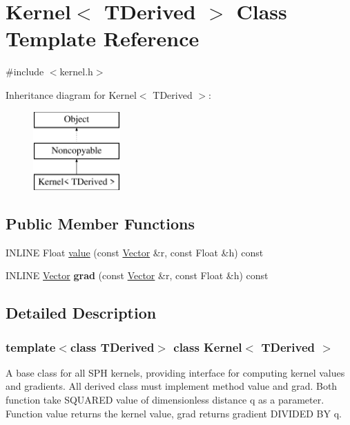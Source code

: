 \hypertarget{classKernel}{}\section{Kernel$<$ T\+Derived $>$ Class Template Reference}
\label{classKernel}


{\ttfamily \#include $<$kernel.\+h$>$}

Inheritance diagram for Kernel$<$ T\+Derived $>$\+:\begin{figure}[H]
\begin{center}
\leavevmode
\includegraphics[height=3.000000cm]{classKernel}
\end{center}
\end{figure}
\subsection*{Public Member Functions}
\begin{DoxyCompactItemize}
\item 
I\+N\+L\+I\+NE Float \hyperlink{classKernel_aa8b9718f58edb6353460653f61b28131}{value} (const \hyperlink{classBasicVector}{Vector} \&r, const Float \&h) const
\item 
\hypertarget{classKernel_af6bb7a4aafc292cfca4225f2c6150509}{}\label{classKernel_af6bb7a4aafc292cfca4225f2c6150509} 
I\+N\+L\+I\+NE \hyperlink{classBasicVector}{Vector} {\bfseries grad} (const \hyperlink{classBasicVector}{Vector} \&r, const Float \&h) const
\end{DoxyCompactItemize}


\subsection{Detailed Description}
\subsubsection*{template$<$class T\+Derived$>$\newline
class Kernel$<$ T\+Derived $>$}

A base class for all S\+PH kernels, providing interface for computing kernel values and gradients. All derived class must implement method {\ttfamily value} and {\ttfamily grad}. Both function take S\+Q\+U\+A\+R\+ED value of dimensionless distance q as a parameter. Function value returns the kernel value, grad returns gradient D\+I\+V\+I\+D\+ED BY q. 

